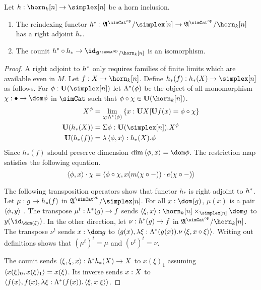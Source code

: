 \documentclass[csh.tex]{subfiles}
\begin{document}
\begin{lemma} Let $h\of \horn_k[n]\to \simplex[n]$ be a horn inclusion.
\begin{enumerate}
\item The reindexing functor $h\ri\of\ambient\s/\simplex[n]\to\ambient\s/\horn_k[n]$ has a right adjoint $h_*$.
\item The counit $h\ri\circ h_*\to\id_{\ambient\s/\horn_k[n]}$ is an isomorphism.
\end{enumerate}\label{h_*} 
\end{lemma}

\begin{proof} 
\newcommand\subs{\Lambda\ri}
A right adjoint to $h^*$ only requires families of finite limits which are available even in $M$.
Let $f\of X\to \horn_k[n]$. Define $h_*(f)\of h_*(X)\to \simplex[n]$ as follows.
For $\phi\of\base(\simplex[n])$ let $\subs(\phi)$ be the object of all monomorphism $\chi\of \bullet\to \dom \phi$ in $\simCat$ such that $\phi\circ \chi \in \base(\horn_k[n])$.
\begin{align*}
X^\phi &= \lim\limits_{\chi\of \subs(\phi)} \set{ x\of \base X | \base f(x) = \phi\circ \chi }\\
\base(h_*(X)) &= \Sigma \phi\of\base(\simplex[n]). X^\phi\\
\base(h_*(f)) &= \lambda\tuplet{\phi,x}\of h_*(X).\phi
\end{align*}
Since $h_*(f)$ should preserve dimension $\dim\tuplet{\phi,x}=\dom\phi$. The restriction map satisfies the following equation.
\[ \left\langle \phi,x \right\rangle\cdot\chi = \left\langle \phi\circ\chi,x(m(\chi\circ-))\cdot e(\chi\circ-) \right\rangle\] %

The following transposition operators show that functor $h_*$ is right adjoint to $h^*$.
Let $\mu: g\to h_*(f)$ in $\ambient\s/\simplex[n]$. For all $x\of\dom(g)$, $\mu(x)$ is a pair $\left\langle \phi,y \right\rangle$ .
The transpose $\mu^t: h^*(g) \to f$ sends $\tuplet{\xi,x}\of \horn_k[n]\times_{\simplex[n]}\dom g$ to $y(\id_{\dom(\xi)})$.
In the other direction, let $\nu: h^*(g)\to f$ in $\ambient\s/\horn_k[n]$. The transpose $\nu^t$ sends $x\of \dom g$ to $\tuplet{g(x),\lambda\xi\of\subs(g(x)).\nu\tuplet{\xi,x\circ\xi}}$. Writing out definitions shows that $(\mu^t)^t=\mu$ and $(\nu^t)^t=\nu$.

The counit sends $\left\langle \xi,\xi,x \right\rangle : h^* h_*(X)\to X$ to $x(\xi)_1$ assuming $\left\langle x(\xi)_0,x(\xi)_1 \right\rangle=x(\xi)$. Its inverse sends $x: X$ to $\tuplet{f(x),f(x),\lambda \xi\of\subs(f(x)).\tuplet{\xi,x|\xi}}$.
\end{proof}
\end{document}
